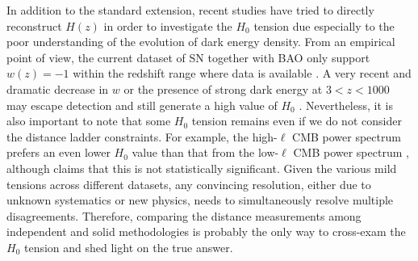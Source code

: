 \documentclass[useAMS,usenatbib]{mnras}
\begin{document}

In addition to the standard extension, recent studies \citep[e.g.,][Jee et al. submitted]{BernalEtal16,LemosEtal18,JoudakiEtal18,AylorEtal18} have tried to directly reconstruct $H(z)$ in order to investigate the $H_{0}$ tension due especially to the poor understanding of the evolution of dark energy density. From an empirical point of view, the current dataset of SN together with BAO only support $w(z)=-1$ within 
the redshift range where data is available \citep{CuestaEtal16}. A very recent and dramatic decrease in $w$ or the presence of strong dark energy at $3 <z < 1000$ may escape detection and still generate a high value of $H_{0}$ \citep{RiessEtal16}.
Nevertheless, it is also important to note that some $H_{0}$ tension remains even if we do not consider the distance ladder constraints. 
For example, the high-$\ell$ CMB power spectrum prefers an even lower $H_{0}$ value than that from the low-$\ell$ CMB power spectrum \citep{AddisonEtal16,planck18parameter}, although \citet{Planck16c} claims that this is not statistically significant. Given the various mild tensions across different datasets, any convincing resolution, either due to unknown systematics or new physics, needs to simultaneously resolve multiple disagreements. 
Therefore, comparing the distance measurements among independent and solid methodologies is probably the only way to cross-exam the $H_{0}$ tension and shed light on the true answer.
\end{document}
